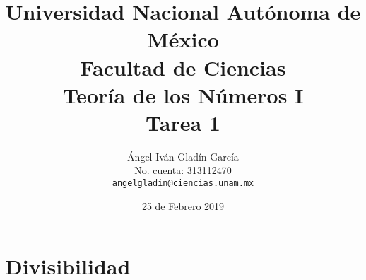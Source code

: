 \documentclass[11pt,letterpaper]{article}
\theoremstyle{definition}\newtheorem{p}{Ejercicio}
\theoremstyle{definition}\newtheorem{pp}[p]{$(*)$Ejercicio}
\numberwithin{p}{section}
\begin{document}
\title{
    \vspace{-2cm}
        Universidad Nacional Autónoma de México\\
        Facultad de Ciencias\\
        Teoría de los Números I\\
    \vspace{.5cm}
    \large
        \textbf{Tarea 1}\\        
}
\author{
    Ángel Iván Gladín García\\
    No. cuenta: 313112470\\
    \texttt{angelgladin@ciencias.unam.mx}
}
\date{25 de Febrero 2019}
\maketitle

\newtheorem{theorem}{Teorema}
\newtheorem{example}{Ejemplo}
\newtheorem{corollary}{Corolario}
\newtheorem{lemma}{Lemma}
\newtheorem{definition}{Definición}
\newtheorem{prop}{Proposición}



\section{Divisibilidad}
\end{document}
